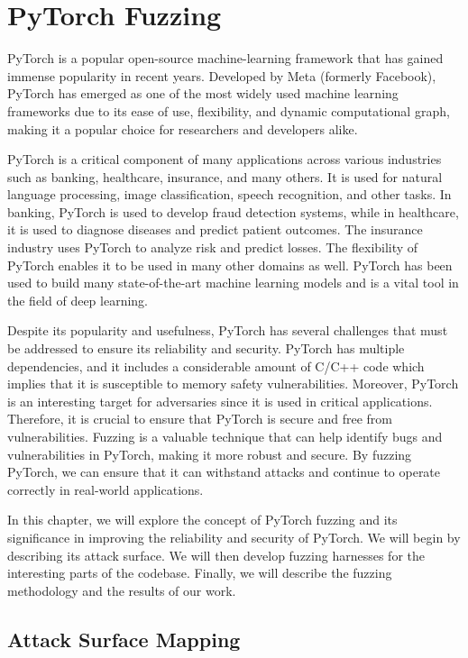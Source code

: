 \section{PyTorch Fuzzing}

PyTorch is a popular open-source machine-learning framework that has gained immense popularity in recent years. Developed by Meta (formerly Facebook), PyTorch has emerged as one of the most widely used machine learning frameworks due to its ease of use, flexibility, and dynamic computational graph, making it a popular choice for researchers and developers alike.

PyTorch is a critical component of many applications across various industries such as banking, healthcare, insurance, and many others. It is used for natural language processing, image classification, speech recognition, and other tasks. In banking, PyTorch is used to develop fraud detection systems, while in healthcare, it is used to diagnose diseases and predict patient outcomes. The insurance industry uses PyTorch to analyze risk and predict losses. The flexibility of PyTorch enables it to be used in many other domains as well. PyTorch has been used to build many state-of-the-art machine learning models and is a vital tool in the field of deep learning.

Despite its popularity and usefulness, PyTorch has several challenges that must be addressed to ensure its reliability and security. PyTorch has multiple dependencies, and it includes a considerable amount of C/C++ code which implies that it is susceptible to memory safety vulnerabilities. Moreover, PyTorch is an interesting target for adversaries since it is used in critical applications. Therefore, it is crucial to ensure that PyTorch is secure and free from vulnerabilities. Fuzzing is a valuable technique that can help identify bugs and vulnerabilities in PyTorch, making it more robust and secure. By fuzzing PyTorch, we can ensure that it can withstand attacks and continue to operate correctly in real-world applications.

In this chapter, we will explore the concept of PyTorch fuzzing and its significance in improving the reliability and security of PyTorch. We will begin by describing its attack surface. We will then develop fuzzing harnesses for the interesting parts of the codebase. Finally, we will describe the fuzzing methodology and the results of our work.

\subsection{Attack Surface Mapping}

